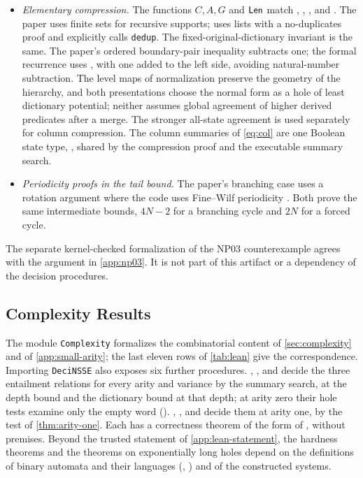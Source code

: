 \begin{itemize}[leftmargin=*]
\item \emph{Elementary compression.} The functions $C,A,G$ and $\mathsf{Len}$
match , ,
, and
. The paper uses finite sets for
recursive supports;  uses
lists with a no-duplicates proof and explicitly calls \texttt{dedup}.
The fixed-original-dictionary invariant is the same. The paper's ordered
boundary-pair inequality subtracts one; the formal recurrence uses
, with one added to the
left side, avoiding natural-number subtraction. The level maps of
normalization preserve the geometry of the hierarchy, and both
presentations choose the normal form as a hole of least dictionary
potential; neither assumes global
agreement of higher derived predicates after a merge. The stronger
all-state agreement is used separately for column compression. The column
summaries of \eqref{eq:col} are one Boolean state type,
, shared by the compression proof and the
executable summary search.
\item \emph{Periodicity proofs in the tail bound.} The paper's branching case uses a rotation
argument where the code uses Fine--Wilf periodicity \citep{FineWilf65}. Both prove the same
intermediate bounds, $4N-2$ for a branching cycle and $2N$ for a forced cycle.
\end{itemize}


The separate kernel-checked formalization of the NP03 counterexample
agrees with the argument in \cref{app:np03}. It is not part of this
artifact or a dependency of the decision procedures.

\subsection{Complexity Results}
\label{app:lean-complexity}
The module \texttt{Complexity} formalizes the combinatorial content of
\cref{sec:complexity} and of \cref{app:small-arity}; the last eleven rows of
\cref{tab:lean} give the correspondence. Importing \texttt{DeciNSSE} also
exposes six further procedures. , , and
 decide the three entailment relations for
every arity and variance by the summary search, at the depth bound
 and the dictionary bound
 at that depth; at arity zero their
hole tests examine only the empty word
().
, , and
 decide them at arity one, by the test of
\cref{thm:arity-one}. Each has a correctness theorem of the form of
, without premises. Beyond the trusted statement
of \cref{app:lean-statement}, the hardness theorems and the theorems on
exponentially long holes depend on the definitions of binary automata and
their languages (,
) and of the constructed systems.

